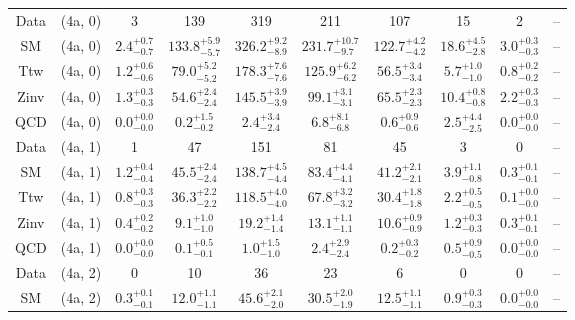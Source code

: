 \begin{table}[h!]
{\begin{tabular}{cccccccccc}
	Data & (4a, 0) & 3 & 139 & 319 & 211 & 107 & 15 & 2 & -- \\[0.5ex] 
	SM & (4a, 0) & $2.4^{+ 0.7 }_{- 0.7 }$ & $133.8^{+ 5.9 }_{- 5.7 }$ & $326.2^{+ 9.2 }_{- 8.9 }$ & $231.7^{+ 10.7 }_{- 9.7 }$ & $122.7^{+ 4.2 }_{- 4.2 }$ & $18.6^{+ 4.5 }_{- 2.8 }$ & $3.0^{+ 0.3 }_{- 0.3 }$ & -- \\[0.5ex] 
	Ttw & (4a, 0) & $1.2^{+ 0.6 }_{- 0.6 }$ & $79.0^{+ 5.2 }_{- 5.2 }$ & $178.3^{+ 7.6 }_{- 7.6 }$ & $125.9^{+ 6.2 }_{- 6.2 }$ & $56.5^{+ 3.4 }_{- 3.4 }$ & $5.7^{+ 1.0 }_{- 1.0 }$ & $0.8^{+ 0.2 }_{- 0.2 }$ & -- \\[0.5ex] 
	Zinv & (4a, 0) & $1.3^{+ 0.3 }_{- 0.3 }$ & $54.6^{+ 2.4 }_{- 2.4 }$ & $145.5^{+ 3.9 }_{- 3.9 }$ & $99.1^{+ 3.1 }_{- 3.1 }$ & $65.5^{+ 2.3 }_{- 2.3 }$ & $10.4^{+ 0.8 }_{- 0.8 }$ & $2.2^{+ 0.3 }_{- 0.3 }$ & -- \\[0.5ex] 
	QCD & (4a, 0) & $0.0^{+ 0.0 }_{- 0.0 }$ & $0.2^{+ 1.5 }_{- 0.2 }$ & $2.4^{+ 3.4 }_{- 2.4 }$ & $6.8^{+ 8.1 }_{- 6.8 }$ & $0.6^{+ 0.9 }_{- 0.6 }$ & $2.5^{+ 4.4 }_{- 2.5 }$ & $0.0^{+ 0.0 }_{- 0.0 }$ & -- \\[0.5ex] 
	Data & (4a, 1) & 1 & 47 & 151 & 81 & 45 & 3 & 0 & -- \\[0.5ex] 
	SM & (4a, 1) & $1.2^{+ 0.4 }_{- 0.4 }$ & $45.5^{+ 2.4 }_{- 2.4 }$ & $138.7^{+ 4.5 }_{- 4.4 }$ & $83.4^{+ 4.4 }_{- 4.1 }$ & $41.2^{+ 2.1 }_{- 2.1 }$ & $3.9^{+ 1.1 }_{- 0.8 }$ & $0.3^{+ 0.1 }_{- 0.1 }$ & -- \\[0.5ex] 
	Ttw & (4a, 1) & $0.8^{+ 0.3 }_{- 0.3 }$ & $36.3^{+ 2.2 }_{- 2.2 }$ & $118.5^{+ 4.0 }_{- 4.0 }$ & $67.8^{+ 3.2 }_{- 3.2 }$ & $30.4^{+ 1.8 }_{- 1.8 }$ & $2.2^{+ 0.5 }_{- 0.5 }$ & $0.1^{+ 0.0 }_{- 0.0 }$ & -- \\[0.5ex] 
	Zinv & (4a, 1) & $0.4^{+ 0.2 }_{- 0.2 }$ & $9.1^{+ 1.0 }_{- 1.0 }$ & $19.2^{+ 1.4 }_{- 1.4 }$ & $13.1^{+ 1.1 }_{- 1.1 }$ & $10.6^{+ 0.9 }_{- 0.9 }$ & $1.2^{+ 0.3 }_{- 0.3 }$ & $0.3^{+ 0.1 }_{- 0.1 }$ & -- \\[0.5ex] 
	QCD & (4a, 1) & $0.0^{+ 0.0 }_{- 0.0 }$ & $0.1^{+ 0.5 }_{- 0.1 }$ & $1.0^{+ 1.5 }_{- 1.0 }$ & $2.4^{+ 2.9 }_{- 2.4 }$ & $0.2^{+ 0.3 }_{- 0.2 }$ & $0.5^{+ 0.9 }_{- 0.5 }$ & $0.0^{+ 0.0 }_{- 0.0 }$ & -- \\[0.5ex] 
	Data & (4a, 2) & 0 & 10 & 36 & 23 & 6 & 0 & 0 & -- \\[0.5ex] 
	SM & (4a, 2) & $0.3^{+ 0.1 }_{- 0.1 }$ & $12.0^{+ 1.1 }_{- 1.1 }$ & $45.6^{+ 2.1 }_{- 2.0 }$ & $30.5^{+ 2.0 }_{- 1.9 }$ & $12.5^{+ 1.1 }_{- 1.1 }$ & $0.9^{+ 0.3 }_{- 0.3 }$ & $0.0^{+ 0.0 }_{- 0.0 }$ & -- \\[0.5ex] 

\end{tabular}}
\end{table}
